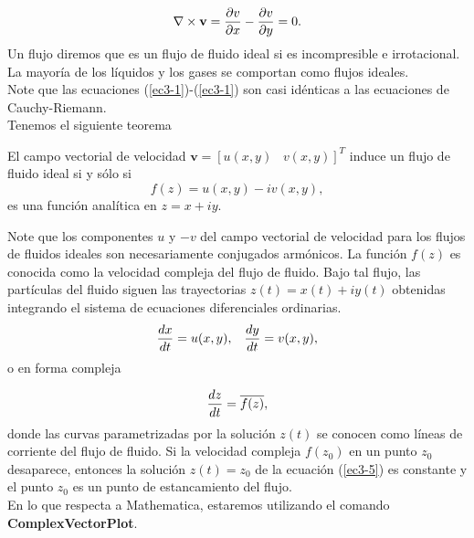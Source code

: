 \begin{equation}\label{ec3-2}
	\nabla \times \textbf{v} =\dfrac{\partial v}{\partial x}-\dfrac{\partial v}{\partial y}=0.
\end{equation}
Un flujo diremos que es un flujo de fluido ideal si es incompresible e irrotacional. La mayoría de los líquidos y los gases se comportan como flujos ideales.\\
Note que las ecuaciones (\ref{ec3-1})-(\ref{ec3-1}) son casi idénticas a las ecuaciones de Cauchy-Riemann.\\ 
\noindent Tenemos el siguiente teorema
\begin{teor}
	El campo vectorial de velocidad $\textbf{v}=[u(x,y)\;\;\; v(x,y)]^{T}$ induce un flujo de fluido ideal si y sólo si
	\begin{equation}\label{ec3-3}
		f(z)=u(x,y)-iv(x,y),
	\end{equation}
	es una función analítica en $z=x+iy$.\endproof
\end{teor}
Note que los componentes $u$ y $-v$ del campo vectorial de velocidad para los flujos de fluidos ideales son necesariamente conjugados armónicos. La función $f(z)$ es conocida como la velocidad compleja del flujo de fluido. Bajo tal flujo, las partículas del fluido siguen las trayectorias $z(t) = x(t)+iy(t)$ obtenidas integrando el sistema de ecuaciones diferenciales ordinarias.
\begin{equation}\label{ec3-4}
	\dfrac{dx}{dt}=u(x,y),\; \; \; \dfrac{dy}{dt}=v(x,y),
\end{equation}
o en forma compleja 

\begin{equation}\label{ec3-5}
	\dfrac{dz}{dt}=\overline{f(z)},
\end{equation}
donde las curvas parametrizadas por la solución $z(t)$ se conocen como líneas de corriente del flujo de fluido. Si la velocidad compleja $f(z_0)$ en un punto $z_0$ desaparece, entonces la solución $z(t) = z_0$ de la ecuación (\ref{ec3-5}) es constante y el punto $z_0$ es un punto de estancamiento del flujo.\\
En lo que respecta a Mathematica, estaremos utilizando el comando \textbf{ComplexVectorPlot}. 

